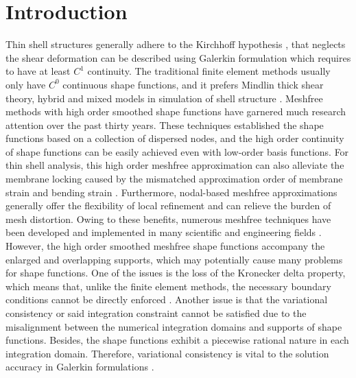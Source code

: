 \section{Introduction}\label{introduction}
Thin shell structures generally adhere to the Kirchhoff hypothesis \cite{donnell1976}, that neglects the shear deformation can be described using Galerkin formulation which requires to have at least $C^1$ continuity. The traditional finite element methods usually only have $C^0$ continuous shape functions, and it prefers Mindlin thick shear theory, hybrid and mixed models in simulation of shell structure  \cite{hughes2000}. Meshfree methods \cite{belytschko1994,liu1995,chen2017} with high order smoothed shape functions have garnered much research attention over the past thirty years. These techniques established the shape functions based on a collection of dispersed nodes, and the high order continuity of shape functions can be easily achieved even with low-order basis functions. For thin shell analysis, this high order meshfree approximation can also alleviate the membrane locking caused by the mismatched approximation order of membrane strain and bending strain \cite{krysl1996}. Furthermore, nodal-based meshfree approximations generally offer the flexibility of local refinement and can relieve the burden of mesh distortion. Owing to these benefits, numerous meshfree techniques have been developed and implemented in many scientific and engineering fields \cite{liu2009,zhang2000,millan2011,wang2023b,suchde2022,deng2023a}. However, the high order smoothed meshfree shape functions accompany the enlarged and overlapping supports, which may potentially cause many problems for shape functions. One of the issues is the loss of the Kronecker delta property, which means that, unlike the finite element methods, the necessary boundary conditions cannot be directly enforced  \cite{fernandez-mendez2004}. Another issue is that the variational consistency or said integration constraint cannot be satisfied due to the misalignment between the numerical integration domains and supports of shape functions. Besides, the shape functions exhibit a piecewise rational nature in each integration domain. Therefore, variational consistency is vital to the solution accuracy in Galerkin formulations \cite{li2016, wu2021}.

